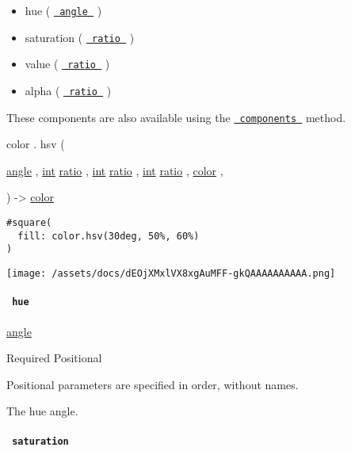\begin{itemize}
\tightlist
\item
  hue ( \href{/docs/reference/layout/angle/}{\texttt{\ angle\ }} )
\item
  saturation ( \href{/docs/reference/layout/ratio/}{\texttt{\ ratio\ }}
  )
\item
  value ( \href{/docs/reference/layout/ratio/}{\texttt{\ ratio\ }} )
\item
  alpha ( \href{/docs/reference/layout/ratio/}{\texttt{\ ratio\ }} )
\end{itemize}

These components are also available using the
\href{/docs/reference/visualize/color/\#definitions-components}{\texttt{\ components\ }}
method.

color { . } { hsv } (

{ \href{/docs/reference/layout/angle/}{angle} , } {
\href{/docs/reference/foundations/int/}{int}
\href{/docs/reference/layout/ratio/}{ratio} , } {
\href{/docs/reference/foundations/int/}{int}
\href{/docs/reference/layout/ratio/}{ratio} , } {
\href{/docs/reference/foundations/int/}{int}
\href{/docs/reference/layout/ratio/}{ratio} , } {
\href{/docs/reference/visualize/color/}{color} , }

) -\textgreater{} \href{/docs/reference/visualize/color/}{color}

\begin{verbatim}
#square(
  fill: color.hsv(30deg, 50%, 60%)
)
\end{verbatim}

\texttt{[image: /assets/docs/dEOjXMxlVX8xgAuMFF-gkQAAAAAAAAAA.png]}

\paragraph{\texorpdfstring{\texttt{\ hue\ }}{ hue }}\label{definitions-hsv-hue}

\href{/docs/reference/layout/angle/}{angle}

{Required} {{ Positional }}

\label{definitions-hsv-hue-positional-tooltip}
Positional parameters are specified in order, without names.

The hue angle.

\paragraph{\texorpdfstring{\texttt{\ saturation\ }}{ saturation }}\label{definitions-hsv-saturation}

